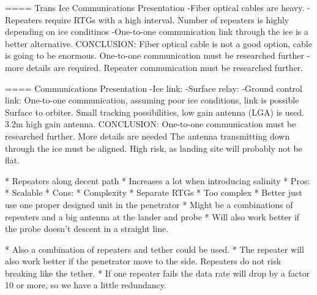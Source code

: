 ==== Trans Ice Communications Presentation
    -Fiber optical cables are heavy.
    -Repeaters require RTGs with a high interval. Number of repeaters is highly depending on ice conditinos
    -One-to-one communication link through the ice is a better alternative.
CONCLUSION: Fiber optical cable is not a good option, cable is going to be enormous.
            One-to-one communication must be researched further - more details are required.
            Repeater communication must be researched further.
            
==== Communications Presentation
-Ice link:
-Surface relay:
-Ground control link:
One-to-one communication, assuming poor ice conditions, link is possible
Surface to orbiter. Small tracking possibilities, low gain antenna (LGA) is used.
3.2m high gain antenna.
CONCLUSION: One-to-one communication must be researched further. More details are needed
            The antenna transmitting down through the ice must be aligned. High risk, as landing site will probably not be flat.

* Repeaters along decent path
	* Increases a lot when introducing salinity
	* Pros:
		* Scalable
	* Cons:
		* Complexity
		* Separate RTGs
	* Too complex
		* Better just use one proper designed unit in the penetrator
		* Might be a combinations of repeaters and a big antenna at the lander and probe
		* Will also work better if the probe doesn't descent in a straight line.

	* Also a combination of repeaters and tether could be used.
	* The repeater will also work better if the penetrator move to the side. Repeaters do not risk breaking like the tether.
	* If one repeater fails the data rate will drop by a factor 10 or more, so we have a little redundancy.
